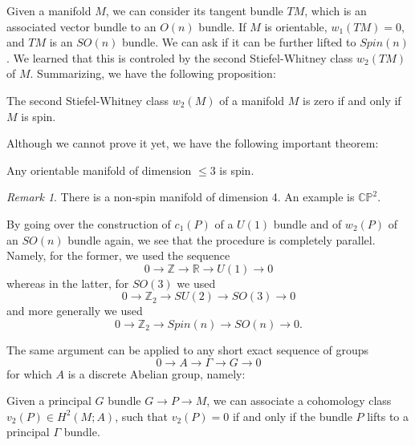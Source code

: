 \documentclass[12pt]{article}
\numberwithin{equation}{section}
\numberwithin{figure}{section}
\theoremstyle{remark}
\newtheorem{remark}[definition]{Remark}
\def\bR{\mathbb{R}}
\def\bZ{\mathbb{Z}}
\def\CP{\mathbb{CP}}
\begin{document}
Given a manifold $M$, we can consider its tangent bundle $TM$, which is an associated vector bundle to an $O(n)$ bundle.
If $M$ is orientable, $w_1(TM)=0$, and $TM$ is an $SO(n)$ bundle.
We can ask if it can be further lifted to $Spin(n)$.
We learned that this is controled by the second Stiefel-Whitney class $w_2(TM)$ of $M$.
Summarizing, we have the following proposition:
\begin{proposition}
The second Stiefel-Whitney class $w_2(M)$ of a manifold $M$ is zero if and only if $M$ is spin.
\end{proposition}

Although we cannot prove it yet, we have the following important theorem:
\begin{theorem}
Any orientable manifold of dimension $\leq 3$ is spin.
\end{theorem}

\begin{remark}
There is a non-spin manifold of dimension 4. An example is $\CP^2$.
\end{remark}


By going over the construction of $c_1(P)$ of a $U(1)$ bundle and 
of $w_2(P)$ of an $SO(n)$ bundle again,
we see that the procedure is completely parallel.
Namely, for the former, we used the sequence \begin{equation}
0\to \bZ\to \bR \to U(1)\to 0 
\end{equation} whereas in the latter, for $SO(3)$ we used \begin{equation}
0\to \bZ_2\to SU(2)\to SO(3)\to 0
\end{equation} and more generally we used \begin{equation}
0\to \bZ_2\to Spin(n)\to SO(n)\to 0.
\end{equation}

The same argument can be applied to any short exact sequence of groups \begin{equation}
0\to A\to \Gamma \to G\to 0
\end{equation} for which $A$ is a discrete Abelian group,
namely:
\begin{proposition}
  Given a principal $G$ bundle $G\to P\to M$,
  we can associate a cohomology class $v_2(P)\in H^2(M;A)$,
  such that $v_2(P)=0$ if and only if the bundle $P$ lifts to a principal $\Gamma$ bundle.
\end{proposition}
\end{document}
